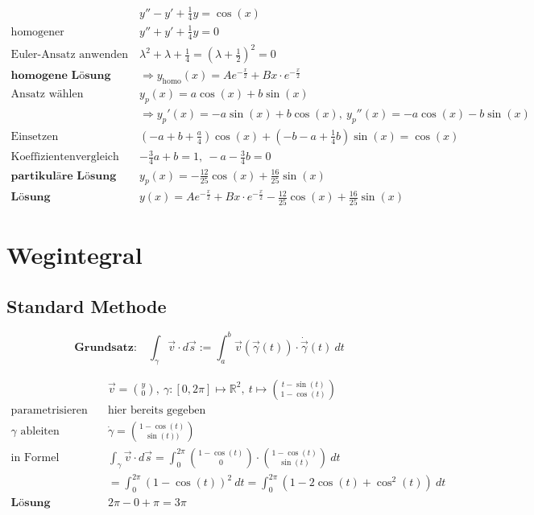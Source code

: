 \documentclass[11pt]{article}
\begin{document}
\begin{equation*}
\begin{split}
	& y'' - y' + \frac{1}{4}y = \cos(x) \\
	\text{homogener}\quad & y'' + y' + \frac{1}{4}y = 0 \\
	\text{Euler-Ansatz anwenden}\quad & \lambda^2 + \lambda + \frac{1}{4} = (\lambda + \frac{1}{2})^2 = 0 \\
	\textbf{homogene L{\"o}sung}\quad &\Rightarrow y_\text{homo}(x) = Ae^{-\frac{x}{2}} + Bx \cdot e^{-\frac{x}{2}} \\
	\text{Ansatz w{\"a}hlen}\quad & y_p(x) = a\cos(x) + b\sin(x) \\
							  & \Rightarrow y_p'(x) = -a\sin(x) + b\cos(x),\  y_p''(x) = -a\cos(x) -b \sin(x) \\
	\text{Einsetzen}\quad & (-a + b + \frac{a}{4})\cos(x) + (-b -a + \frac{1}{4}b)\sin(x) = \cos(x) \\
	\text{Koeffizientenvergleich}\quad & -\frac{3}{4}a + b = 1,\ -a-\frac{3}{4}b = 0 \\
	\textbf{partikul{\"a}re L{\"o}sung}\quad & y_p(x) = -\frac{12}{25}\cos(x) + \frac{16}{25}\sin(x) \\
	\textbf{L{\"o}sung}\quad & y(x) = Ae^{-\frac{x}{2}} + Bx \cdot e^{-\frac{x}{2}} -\frac{12}{25}\cos(x) + \frac{16}{25}\sin(x)
\end{split}
\end{equation*}

\section{Wegintegral}

\subsection{Standard Methode}

\begin{equation*}
	\textbf{Grundsatz:}\quad \int_\gamma \vec{v}\cdot d\vec{s} := \int_a^b \vec{v}(\vec{\gamma}(t)) \cdot \dot\vec{\gamma}(t)\ dt
\end{equation*}

\begin{equation*}
\begin{split}
	& \vec{v} = \binom{y}{0},\ \gamma:[0, 2\pi] \mapsto \mathbb{R}^2,\ t \mapsto \binom{t -\sin(t)}{1-\cos(t)} \\
	\text{parametrisieren}\quad & \text{hier bereits gegeben} \\
	\text{$\gamma$ ableiten}\quad & \dot\gamma = \binom{1-\cos(t)}{\sin(t))} \\
	\text{in Formel einsetzen}\quad & \int_\gamma \vec{v} \cdot d\vec{s} = \int_0^{2\pi} \binom{1-\cos(t)}{0}\cdot\binom{1-\cos(t)}{\sin(t)}\ dt \\
	&= \int_0^{2\pi} (1-\cos(t))^2\ dt = \int_0^{2\pi} (1-2\cos(t)+\cos^2(t))\ dt \\
	\textbf{L{\"o}sung}\quad & 2\pi - 0 + \pi = 3\pi
\end{split}
\end{equation*}
\end{document}
